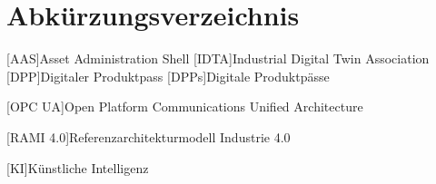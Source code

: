 \section*{Abkürzungsverzeichnis}
\begin{singlespacing}
\end{singlespacing}
\begin{acronym}

[AAS]{Asset Administration Shell}
[IDTA]{Industrial Digital Twin Association}
[DPP]{Digitaler Produktpass}
[DPPs]{Digitale Produktpässe}

[OPC UA]{Open Platform Communications Unified Architecture}

[RAMI 4.0]{Referenzarchitekturmodell Industrie 4.0}

[KI]{Künstliche Intelligenz}

\end{acronym}



\newpage